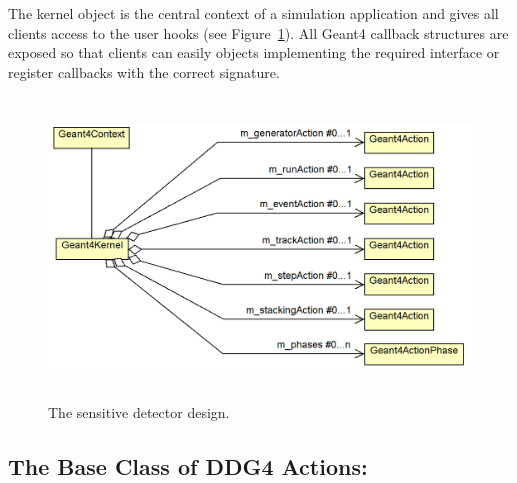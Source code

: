 \documentclass[10pt,a4paper]{article}
\begin{document}
\noindent
The kernel object is the central context of a \DDG simulation application and
gives all clients access to the user hooks (see Figure~\ref{fig:ddg4-geant4-kernel}).
All Geant4 callback structures are exposed so that clients can easily 
objects implementing the required interface or register callbacks with the 
correct signature.
\begin{figure}[h]
  \begin{center}
    \includegraphics[height=80mm] {DDG4-Geant4Kernel.png}
    \caption{The sensitive detector design.}
    \label{fig:ddg4-geant4-kernel}
  \end{center}
\end{figure}

\subsection{The Base Class of DDG4 Actions: }
\label{sec:ddg4-user-manual-implementation-geant4action-base}
\end{document}
